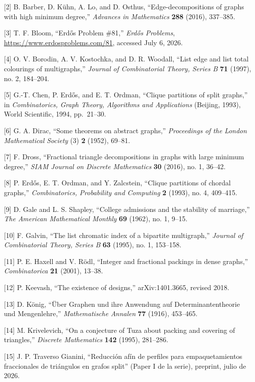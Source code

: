\documentclass[spanish,11pt,a4paper]{article}
\begin{document}
{[}2{]} B. Barber, D. Kühn, A. Lo, and D. Osthus, ``Edge-decompositions
of graphs with high minimum degree,'' \emph{Advances in Mathematics}
\textbf{288} (2016), 337--385.

{[}3{]} T. F. Bloom, ``Erdős Problem \#81,'' \emph{Erdős Problems},
\url{https://www.erdosproblems.com/81}, accessed July 6, 2026.

{[}4{]} O. V. Borodin, A. V. Kostochka, and D. R. Woodall, ``List edge
and list total colourings of multigraphs,'' \emph{Journal of
Combinatorial Theory, Series B} \textbf{71} (1997), no. 2, 184--204.

{[}5{]} G.-T. Chen, P. Erdős, and E. T. Ordman, ``Clique partitions of
split graphs,'' in \emph{Combinatorics, Graph Theory, Algorithms and
Applications} (Beijing, 1993), World Scientific, 1994, pp.~21--30.

{[}6{]} G. A. Dirac, ``Some theorems on abstract graphs,''
\emph{Proceedings of the London Mathematical Society} (3) \textbf{2}
(1952), 69--81.

{[}7{]} F. Dross, ``Fractional triangle decompositions in graphs with
large minimum degree,'' \emph{SIAM Journal on Discrete Mathematics}
\textbf{30} (2016), no. 1, 36--42.

{[}8{]} P. Erdős, E. T. Ordman, and Y. Zalcstein, ``Clique partitions of
chordal graphs,'' \emph{Combinatorics, Probability and Computing}
\textbf{2} (1993), no. 4, 409--415.

{[}9{]} D. Gale and L. S. Shapley, ``College admissions and the
stability of marriage,'' \emph{The American Mathematical Monthly}
\textbf{69} (1962), no. 1, 9--15.

{[}10{]} F. Galvin, ``The list chromatic index of a bipartite
multigraph,'' \emph{Journal of Combinatorial Theory, Series B}
\textbf{63} (1995), no. 1, 153--158.

{[}11{]} P. E. Haxell and V. Rödl, ``Integer and fractional packings in
dense graphs,'' \emph{Combinatorica} \textbf{21} (2001), 13--38.

{[}12{]} P. Keevash, ``The existence of designs,'' arXiv:1401.3665,
revised 2018.

{[}13{]} D. König, ``Über Graphen und ihre Anwendung auf
Determinantentheorie und Mengenlehre,'' \emph{Mathematische Annalen}
\textbf{77} (1916), 453--465.

{[}14{]} M. Krivelevich, ``On a conjecture of Tuza about packing and
covering of triangles,'' \emph{Discrete Mathematics} \textbf{142}
(1995), 281--286.

{[}15{]} J. P. Traverso Gianini, ``Reducción afín de perfiles para
empaquetamientos fraccionales de triángulos en grafos split'' (Paper I
de la serie), preprint, julio de 2026.
\end{document}
